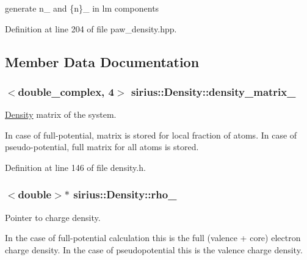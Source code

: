 generate n\+\_ and \{n\}\+\_ in lm components 



Definition at line 204 of file paw\+\_\+density.\+hpp.



\subsection{Member Data Documentation}
\hypertarget{classsirius_1_1_density_aae98b9da0334e70ab463a59ed0afe75d}{}
\subsubsection[{density\+\_\+matrix\+\_\+}]{$<$double\+\_\+complex, 4$>$ sirius\+::\+Density\+::density\+\_\+matrix\+\_\+\hspace{0.3cm}{\ttfamily [private]}}\label{classsirius_1_1_density_aae98b9da0334e70ab463a59ed0afe75d}


\hyperlink{classsirius_1_1_density}{Density} matrix of the system. 

In case of full-\/potential, matrix is stored for local fraction of atoms. In case of pseudo-\/potential, full matrix for all atoms is stored. 

Definition at line 146 of file density.\+h.

\hypertarget{classsirius_1_1_density_abc158fb9460608eb1d4c07775e0726f0}{}
\subsubsection[{rho\+\_\+}]{$<$double$>$$\ast$ sirius\+::\+Density\+::rho\+\_\+\hspace{0.3cm}{\ttfamily [private]}}\label{classsirius_1_1_density_abc158fb9460608eb1d4c07775e0726f0}


Pointer to charge density. 

In the case of full-\/potential calculation this is the full (valence + core) electron charge density. In the case of pseudopotential this is the valence charge density. 

